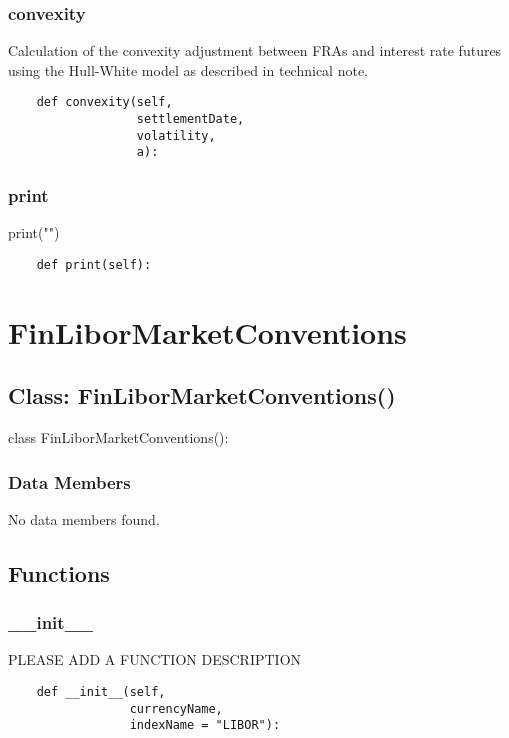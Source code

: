\documentclass[twoside,11pt]{book}
\begin{document}
\subsubsection*{{\bf convexity}}
Calculation of the convexity adjustment between FRAs and interest rate futures using the Hull-White model as described in technical note.  

\begin{lstlisting}
    def convexity(self,
                  settlementDate,
                  volatility,
                  a):
\end{lstlisting}

\subsubsection*{{\bf print}}
print("") 

\begin{lstlisting}
    def print(self):
\end{lstlisting}

\newpage
\section{FinLiborMarketConventions}

\subsection*{Class: FinLiborMarketConventions()}
class FinLiborMarketConventions(): 

\subsubsection*{Data Members}
No data members found.

\subsection*{Functions}

\subsubsection*{{\bf \_\_init\_\_}}
PLEASE ADD A FUNCTION DESCRIPTION

\begin{lstlisting}
    def __init__(self,
                 currencyName,
                 indexName = "LIBOR"):
\end{lstlisting}

\newpage
\end{document}

